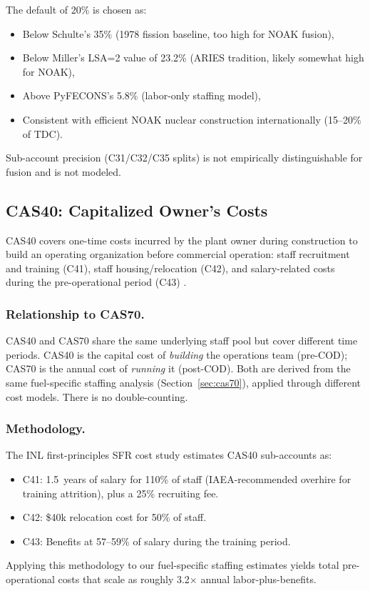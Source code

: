 \documentclass{article}
\begin{document}
The default of 20\% is chosen as:
\begin{itemize}
\item Below Schulte's 35\% (1978 fission baseline, too high for NOAK fusion),
\item Below Miller's LSA=2 value of 23.2\% (ARIES tradition, likely
  somewhat high for NOAK),
\item Above PyFECONS's 5.8\% (labor-only staffing model),
\item Consistent with efficient NOAK nuclear construction internationally
  (15--20\% of TDC).
\end{itemize}

Sub-account precision (C31/C32/C35 splits) is not empirically
distinguishable for fusion and is not modeled.


\subsection{CAS40: Capitalized Owner's Costs}
\label{sec:cas40}

CAS40 covers one-time costs incurred by the plant owner during
construction to build an operating organization before commercial
operation: staff recruitment and training (C41), staff
housing/relocation (C42), and salary-related costs during the
pre-operational period (C43) \citep{emwg2007, prosser2024}.

\subsubsection{Relationship to CAS70.}
CAS40 and CAS70 share the same underlying staff pool but cover
different time periods. CAS40 is the capital cost of \emph{building}
the operations team (pre-COD); CAS70 is the annual cost of
\emph{running} it (post-COD). Both are derived from the same
fuel-specific staffing analysis (Section~\ref{sec:cas70}), applied
through different cost models. There is no double-counting.

\subsubsection{Methodology.}
The INL first-principles SFR cost study \citep{prosser2024}
estimates CAS40 sub-accounts as:
\begin{itemize}
\item C41: 1.5~years of salary for 110\% of staff (IAEA-recommended
  overhire for training attrition), plus a 25\% recruiting fee.
\item C42: \$40k relocation cost for 50\% of staff.
\item C43: Benefits at 57--59\% of salary during the training period.
\end{itemize}
Applying this methodology to our fuel-specific staffing estimates
yields total pre-operational costs that scale as roughly 3.2$\times$
annual labor-plus-benefits.
\end{document}
